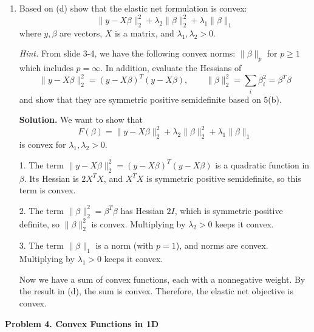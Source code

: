 \documentclass[11pt]{article}
\begin{document}
\begin{enumerate}[label=\textbf{(\alph*)}, leftmargin=1.2cm]
		\item Based on (d) show that the elastic net formulation is convex:
		\[
		\|y - X\beta\|_2^2 + \lambda_2 \|\beta\|_2^2 + \lambda_1 \|\beta\|_1
		\]
		where $y, \beta$ are vectors, $X$ is a matrix, and $\lambda_1, \lambda_2 > 0$.
		
		\noindent\textit{Hint.} From slide 3-4, we have the following convex norms: $\|\beta\|_p$ for $p \ge 1$ which includes $p = \infty$. In addition, evaluate the Hessians of
		\[
		\|y - X\beta\|_2^2 = (y - X\beta)^T (y - X\beta), \qquad
		\|\beta\|_2^2 = \sum_i \beta_i^2 = \beta^T \beta
		\]
		and show that they are symmetric positive semidefinite based on 5(b).
		
		\noindent\textbf{Solution.}
		We want to show that
		\[
		F(\beta) = \|y - X\beta\|_2^2 + \lambda_2 \|\beta\|_2^2 + \lambda_1 \|\beta\|_1
		\]
		is convex for $\lambda_1, \lambda_2 > 0$.
		
		1. The term $\|y - X\beta\|_2^2 = (y - X\beta)^T (y - X\beta)$ is a quadratic function in $\beta$. Its Hessian is $2X^T X$, and $X^T X$ is symmetric positive semidefinite, so this term is convex.
		
		2. The term $\|\beta\|_2^2 = \beta^T \beta$ has Hessian $2I$, which is symmetric positive definite, so $\|\beta\|_2^2$ is convex. Multiplying by $\lambda_2 > 0$ keeps it convex.
		
		3. The term $\|\beta\|_1$ is a norm (with $p=1$), and norms are convex. Multiplying by $\lambda_1 > 0$ keeps it convex.
		
		Now we have a sum of convex functions, each with a nonnegative weight. By the result in (d), the sum is convex. Therefore, the elastic net objective is convex.
		
	\end{enumerate}
	
	\newpage
	
	\vspace{1.5em}
	\noindent\textbf{Problem 4. Convex Functions in 1D}
	
\end{document}

